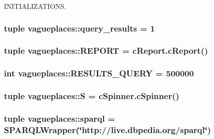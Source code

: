 \-I\-N\-I\-T\-I\-A\-L\-I\-Z\-A\-T\-I\-O\-N\-S. 

\hypertarget{namespacevagueplaces_a22c8a6a4861b99a18d096217c04a39af}{
\subsubsection[{query\-\_\-results}]{\setlength{\rightskip}{0pt plus 5cm}tuple {\bf vagueplaces\-::query\-\_\-results} = 1}}\label{namespacevagueplaces_a22c8a6a4861b99a18d096217c04a39af}
\hypertarget{namespacevagueplaces_a480d6041ef085842ab19117d6c95fc9c}{
\subsubsection[{\-R\-E\-P\-O\-R\-T}]{\setlength{\rightskip}{0pt plus 5cm}tuple {\bf vagueplaces\-::\-R\-E\-P\-O\-R\-T} = {\bf c\-Report.\-c\-Report}()}}\label{namespacevagueplaces_a480d6041ef085842ab19117d6c95fc9c}
\hypertarget{namespacevagueplaces_a07cd0ae682261d720780294aba9e03f4}{
\subsubsection[{\-R\-E\-S\-U\-L\-T\-S\-\_\-\-Q\-U\-E\-R\-Y}]{\setlength{\rightskip}{0pt plus 5cm}int {\bf vagueplaces\-::\-R\-E\-S\-U\-L\-T\-S\-\_\-\-Q\-U\-E\-R\-Y} = 500000}}\label{namespacevagueplaces_a07cd0ae682261d720780294aba9e03f4}
\hypertarget{namespacevagueplaces_a62d09a13c6d9f03428f5a6992dd10644}{
\subsubsection[{\-S}]{\setlength{\rightskip}{0pt plus 5cm}tuple {\bf vagueplaces\-::\-S} = {\bf c\-Spinner.\-c\-Spinner}()}}\label{namespacevagueplaces_a62d09a13c6d9f03428f5a6992dd10644}
\hypertarget{namespacevagueplaces_a327d24ca861ef2c176f7c29da06d2da8}{
\subsubsection[{sparql}]{\setlength{\rightskip}{0pt plus 5cm}tuple {\bf vagueplaces\-::sparql} = \-S\-P\-A\-R\-Q\-L\-Wrapper(\char`\"{}http\-://live.\-dbpedia.\-org/{\bf sparql}\char`\"{})}}\label{namespacevagueplaces_a327d24ca861ef2c176f7c29da06d2da8}
